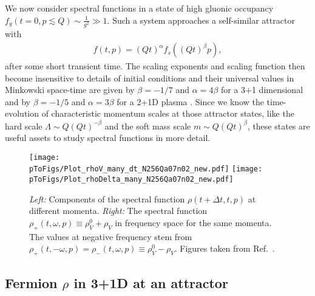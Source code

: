 \documentclass[]{webofc}
\newcommand{\tpert}{t}
\newcommand{\Q}{Q}
\newcommand{\re}{Ref.~}
\newcommand{\pToFigs}{.}
\begin{document}
We now consider spectral functions in a state of high gluonic occupancy $f_g(t{=}0, p \lesssim \Q) \sim \frac{1}{g^2} \gg 1$. 
Such a system approaches a self-similar attractor with
\begin{align}
 \label{eq:self-sim}
 f(t,p) = (\Q t)^{\alpha} f_s\left((\Q t)^{\beta} p \right),
\end{align}
after some short transient time. The scaling exponents and scaling function then become insensitive to details of initial conditions and their universal values in Minkowski space-time are given by $\beta = -1/7$ and $\alpha = 4\beta$ for a 3+1 dimensional \cite{Kurkela:2012hp,Schlichting:2012es,Berges:2013fga} and by $\beta = -1/5$ and $\alpha = 3\beta$ for a 2+1D plasma \cite{Boguslavski:2019fsb}. Since we know the time-evolution of characteristic momentum scales at those attractor states, like the hard scale $\Lambda \sim Q(Q t)^{-\beta}$ and the soft mass scale $m \sim Q(Q t)^{\beta}$, these states are useful assets to study spectral functions in more detail. 


\begin{figure}[t!]
 \centering
 \texttt{[image: \\pToFigs/Plot\_rhoV\_many\_dt\_N256Qa07n02\_new.pdf]}
 \texttt{[image: \\pToFigs/Plot\_rhoDelta\_many\_N256Qa07n02\_new.pdf]}
 \caption{{\em Left:} Components of the spectral function $\rho(\tpert{+}\Delta t, \tpert, p)$ at different momenta. {\em Right:} The spectral function $\rho_+(t,\omega,p) \equiv \rho_V^0 + \rho_V$ in frequency space for the same momenta. The values at negative frequency stem from $\rho_+(t,-\omega,p) = \rho_-(t,\omega,p) \equiv \rho_V^0 - \rho_V$. 
 Figures taken from \re\cite{Boguslavski:2021kdd}.}
 \label{fig:rho_dt_w}
\end{figure}

\subsection{Fermion $\rho$ in 3+1D at an attractor}
\label{sec:fermion_rho_3D}
\end{document}
